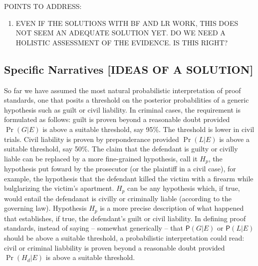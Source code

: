 \documentclass[10pt,dvipsnames,enabledeprecatedfontcommands]{scrartcl}
\providecommand{\tightlist}{%
  \setlength{\itemsep}{0pt}\setlength{\parskip}{0pt}}
\newcommand{\pr}[1]{\mathsf{P}(#1)}
\begin{document}
POINTS TO ADDRESS:

\begin{enumerate}
\def\labelenumi{(\arabic{enumi})}
\tightlist
\item
  EVEN IF THE SOLUTIONS WITH BF AND LR WORK, THIS DOES NOT SEEM AN
  ADEQUATE SOLUTION YET. DO WE NEED A HOLISTIC ASSESSMENT OF THE
  EVIDENCE. IS THIS RIGHT?
\end{enumerate}

\subsection{Specific Narratives {[}IDEAS OF A
SOLUTION{]}}\label{specific-narratives-ideas-of-a-solution}

So far we have assumed the most natural probabilistic interpretation of
proof standards, one that posits a threshold on the posterior
probabilities of a generic hypothesis such as guilt or civil liability.
In criminal cases, the requirement is formulated as follows: guilt is
proven beyond a reasonable doubt provided \(\Pr(G | E)\) is above a
suitable threshold, say 95\%. The threshold is lower in civil trials.
Civil liability is proven by preponderance provided \(\Pr(L | E)\) is
above a suitable threshold, say 50\%. The claim that the defendant is
guilty or civilly liable can be replaced by a more fine-grained
hypothesis, call it \(H_p\), the hypothesis put foward by the prosecutor
(or the plaintiff in a civil case), for example, the hypothesis that the
defendant killed the victim with a firearm while bulglarizing the
victim's apartment. \(H_p\) can be any hypothesis which, if true, would
entail the defendanat is civilly or criminally liable (according to the
governing law). Hypothesis \(H_p\) is a more precise description of what
happened that establishes, if true, the defendant's guilt or civil
liability. In defining proof standards, instead of saying -- somewhat
generically -- that \(\pr{G | E}\) or \(\pr{L | E}\) should be above a
suitable threshold, a probabilistic interpretation could read: civil or
criminal liabbility is proven beyond a reasonable doubt provided
\(\Pr(H_d | E)\) is above a suitable threshold.
\end{document}
